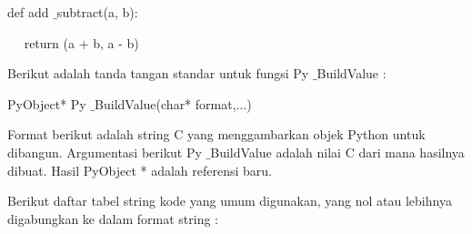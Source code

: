 \documentclass{wileySix}
\begin{document}
\begin{myEnumerate}
\begin{myEnumerate}
{\begin{myEnumerate}
\noindent 
def add $  \_  $subtract(a, b): \par
\noindent 
~~ return (a + b, a - b) \par
\vspace{14pt}
Berikut adalah tanda tangan standar untuk fungsi Py $  \_  $BuildValue  : \par
\noindent 
PyObject* Py $  \_  $BuildValue(char* format,...) \par
\vspace{14pt}
Format berikut adalah string C yang menggambarkan objek Python untuk dibangun. Argumentasi berikut Py $  \_  $BuildValue adalah nilai C dari mana hasilnya dibuat. Hasil PyObject * adalah referensi baru.  \par
Berikut daftar tabel string kode yang umum digunakan, yang nol atau lebihnya digabungkan ke dalam format string : \par





\end{myEnumerate}}
\end{myEnumerate}
\end{myEnumerate}
\end{document}
